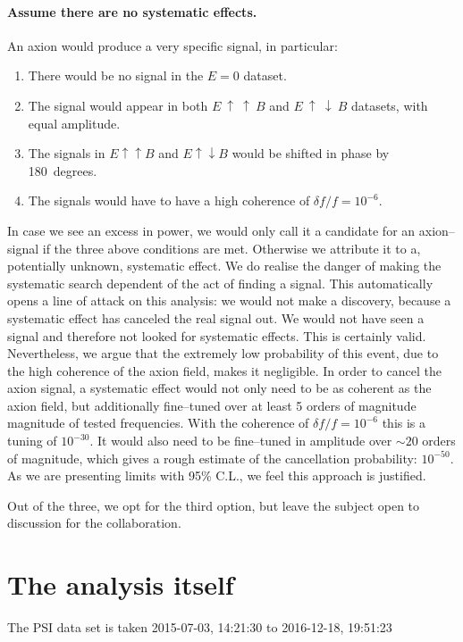 \paragraph{Assume there are no systematic effects.}
An axion would produce a very specific signal, in particular:
\begin{enumerate}
  \item There would be no signal in the $E=0$ dataset.
  \item The signal would appear in both $E~\uparrow~\uparrow~B$ and $E~\uparrow~\downarrow~B$ datasets, with equal amplitude.
  \item The signals in $E \uparrow \uparrow B$ and $E \uparrow \downarrow B$ would be shifted in phase by 180~degrees.
  \item The signals would have to have a high coherence of $\delta f / f = 10^{-6}$.
\end{enumerate}
In case we see an excess in power, we would only call it a candidate for an axion--signal if the three above conditions are met. Otherwise we attribute it to a, potentially unknown, systematic effect. We do realise the danger of making the systematic search dependent of the act of finding a signal. This automatically opens a line of attack on this analysis: we would not make a discovery, because a systematic effect has canceled the real signal out. We would not have seen a signal and therefore not looked for systematic effects. This is certainly valid. Nevertheless, we argue that the extremely low probability of this event, due to the high coherence of the axion field, makes it negligible. In order to cancel the axion signal, a systematic effect would not only need to be as coherent as the axion field, but additionally fine--tuned over at least 5 orders of magnitude magnitude of tested frequencies. With the coherence of $\delta f / f = 10^{-6}$ this is a tuning of $10^{-30}$. It would also need to be fine--tuned in amplitude over $\sim 20$ orders of magnitude, which gives a rough estimate of the cancellation probability: $10^{-50}$. As we are presenting limits with 95\% C.L., we feel this approach is justified.

Out of the three, we opt for the third option, but leave the subject open to discussion for the collaboration.









\section{The analysis itself}
The PSI data set is taken 2015-07-03, 14:21:30 to 2016-12-18, 19:51:23

